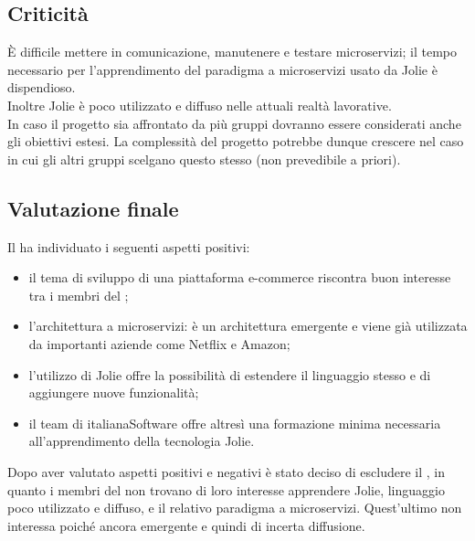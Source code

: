 \subsection {Criticità}
È difficile mettere in comunicazione, manutenere e testare microservizi; il tempo necessario per l'apprendimento del paradigma a microservizi usato da Jolie è dispendioso. \\
Inoltre Jolie è poco utilizzato e diffuso nelle attuali realtà lavorative. \\
In caso il progetto sia affrontato da più gruppi dovranno essere considerati anche gli obiettivi estesi. La complessità del progetto potrebbe dunque crescere nel caso in cui gli altri gruppi scelgano questo stesso  (non prevedibile a priori).


\subsection {Valutazione finale}
Il  ha individuato i seguenti aspetti positivi:
\begin{itemize}
	\item{il tema di sviluppo di una piattaforma e-commerce riscontra buon interesse tra i membri del ;}
	\item{l’architettura a microservizi:} è un architettura emergente e viene già utilizzata da importanti aziende come Netflix e Amazon;
	\item{l’utilizzo di Jolie offre la possibilità di estendere il linguaggio stesso e di aggiungere nuove funzionalità;}
	\item{il team di italianaSoftware offre altresì una formazione minima necessaria all'apprendimento della tecnologia Jolie.}
\end{itemize}

Dopo aver valutato aspetti positivi e negativi è stato deciso di escludere il , in quanto i membri del  non trovano di loro interesse apprendere Jolie, linguaggio poco utilizzato e diffuso, e il relativo paradigma a microservizi. Quest'ultimo non interessa poiché ancora emergente e quindi di incerta diffusione.
